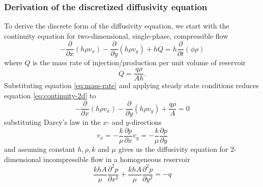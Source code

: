 \subsubsection{Derivation of the discretized diffusivity equation} %
\label{ssub:derivation}
To derive the discrete form of the diffusivity equation, we  start with the continuity equation for two-dimensional, single-phase, compressible flow \cite{Peaceman1977Fundamentals}
\begin{equation}
    \label{eq:continuity-2d}
    - \frac{\partial}{\partial x} \left( h\rho v_x \right) - \frac{\partial}{\partial y} \left( h\rho v_y \right) + hQ = h \frac{\partial }{\partial t} \left( \phi \rho \right)
\end{equation}
where $Q$ is the mass rate of injection/production per unit volume of reservoir
\begin{equation}
    \label{eq:mass-rate}
    Q = \frac{q\rho}{Ah}.
\end{equation}
Substituting equation \eqref{eq:mass-rate} and applying steady state conditions reduces equation \eqref{eq:continuity-2d} to
\begin{equation}
    - \frac{\partial}{\partial x} \left( h\rho v_x \right) - \frac{\partial}{\partial y} \left( h\rho v_y \right) + \frac{q\rho}{A} = 0
\end{equation}
substituting Darcy's law in the $x$- and $y$-directions \cite{Peaceman1977Fundamentals}
\begin{subequations}
    \begin{equation}
        v_x = -\frac{k}{\mu} \frac{\partial p}{\partial x}
    \end{equation}
    \begin{equation}
        v_y = -\frac{k}{\mu} \frac{\partial p}{\partial y}
    \end{equation}
\end{subequations}
and assuming constant $h,\rho,k$ and $\mu$ gives us the diffusivity equation for 2-dimensional incompressible flow in a homogeneous reservoir
\begin{equation}
    \label{eq:differential-flow}
    \frac{khA}{\mu} \frac{\partial^2 p}{\partial x^2}  + \frac{khA}{\mu} \frac{\partial^2 p}{\partial y^2} = -q
\end{equation}

